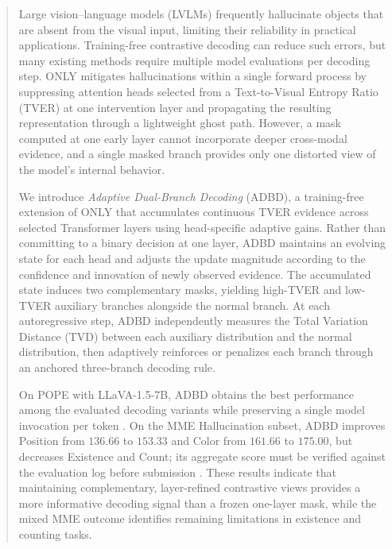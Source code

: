 \begin{abstract}
Large vision--language models (LVLMs) frequently hallucinate objects that are absent from the visual input, limiting their reliability in practical applications. Training-free contrastive decoding can reduce such errors, but many existing methods require multiple model evaluations per decoding step. ONLY mitigates hallucinations within a single forward process by suppressing attention heads selected from a Text-to-Visual Entropy Ratio (TVER) at one intervention layer and propagating the resulting representation through a lightweight ghost path. However, a mask computed at one early layer cannot incorporate deeper cross-modal evidence, and a single masked branch provides only one distorted view of the model's internal behavior.

We introduce \emph{Adaptive Dual-Branch Decoding} (ADBD), a training-free extension of ONLY that accumulates continuous TVER evidence across selected Transformer layers using head-specific adaptive gains. Rather than committing to a binary decision at one layer, ADBD maintains an evolving state for each head and adjusts the update magnitude according to the confidence and innovation of newly observed evidence. The accumulated state induces two complementary masks, yielding high-TVER and low-TVER auxiliary branches alongside the normal branch. At each autoregressive step, ADBD independently measures the Total Variation Distance (TVD) between each auxiliary distribution and the normal distribution, then adaptively reinforces or penalizes each branch through an anchored three-branch decoding rule.

On POPE with LLaVA-1.5-7B, ADBD obtains the best performance among the evaluated decoding variants while preserving a single model invocation per token \todo. On the MME Hallucination subset, ADBD improves Position from $136.66$ to $153.33$ and Color from $161.66$ to $175.00$, but decreases Existence and Count; its aggregate score must be verified against the evaluation log before submission \todo. These results indicate that maintaining complementary, layer-refined contrastive views provides a more informative decoding signal than a frozen one-layer mask, while the mixed MME outcome identifies remaining limitations in existence and counting tasks.
\end{abstract}